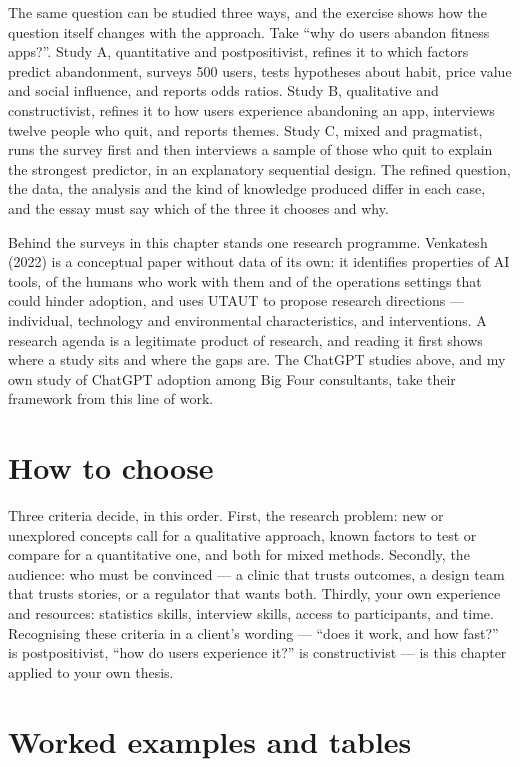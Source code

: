 \documentclass[11pt,a4paper,british,twoside=false,headings=small,chapterprefix=false,numbers=noenddot]{scrbook}
\begin{document}
The same question can be studied three ways, and the exercise shows how the question itself changes with the approach. Take ``why do users abandon fitness apps?''. Study A, quantitative and postpositivist, refines it to which factors predict abandonment, surveys 500 users, tests hypotheses about habit, price value and social influence, and reports odds ratios. Study B, qualitative and constructivist, refines it to how users experience abandoning an app, interviews twelve people who quit, and reports themes. Study C, mixed and pragmatist, runs the survey first and then interviews a sample of those who quit to explain the strongest predictor, in an explanatory sequential design. The refined question, the data, the analysis and the kind of knowledge produced differ in each case, and the essay must say which of the three it chooses and why.

Behind the surveys in this chapter stands one research programme. Venkatesh (2022) is a conceptual paper without data of its own: it identifies properties of AI tools, of the humans who work with them and of the operations settings that could hinder adoption, and uses UTAUT to propose research directions --- individual, technology and environmental characteristics, and interventions. A research agenda is a legitimate product of research, and reading it first shows where a study sits and where the gaps are. The ChatGPT studies above, and my own study of ChatGPT adoption among Big Four consultants, take their framework from this line of work.

\section{How to choose}

Three criteria decide, in this order. First, the research problem: new or unexplored concepts call for a qualitative approach, known factors to test or compare for a quantitative one, and both for mixed methods. Secondly, the audience: who must be convinced --- a clinic that trusts outcomes, a design team that trusts stories, or a regulator that wants both. Thirdly, your own experience and resources: statistics skills, interview skills, access to participants, and time. Recognising these criteria in a client's wording --- ``does it work, and how fast?'' is postpositivist, ``how do users experience it?'' is constructivist --- is this chapter applied to your own thesis.


\section{Worked examples and tables}
\end{document}
